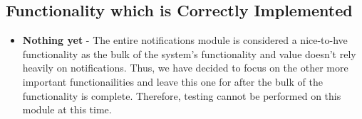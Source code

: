 \documentclass[11pt,fleqn]{book} %
\begin{document}
		\subsection{Functionality which is Correctly Implemented}
			\begin{itemize}
				\item\textbf{Nothing yet} -
				The entire notifications module is considered a nice-to-hve functionality as the bulk of the system's functionality and value doesn't rely heavily on notifications. Thus, we have decided to focus on the other more important functionailities and leave this one for after the bulk of the functionality is complete. Therefore, testing cannot be performed on this module at this time.
			\end{itemize}
%				
%				
%				

\end{document}
